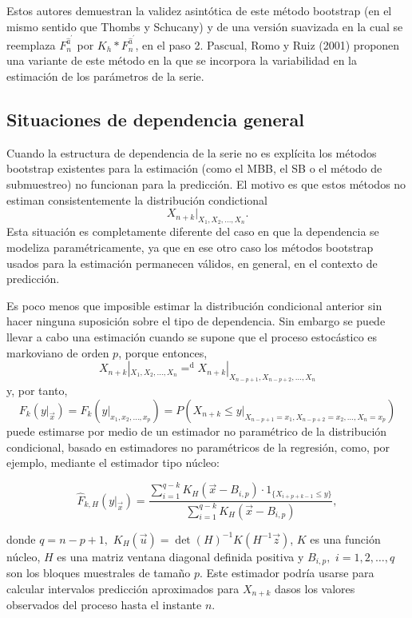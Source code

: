 \documentclass[
]{book}
\theoremstyle{definition}
\theoremstyle{definition}
\theoremstyle{definition}
\theoremstyle{remark}
\begin{document}
Estos autores demuestran la validez asintótica de este método bootstrap
(en el mismo sentido que Thombs y Schucany) y de una versión suavizada
en la cual se reemplaza \(F_n^{\widehat{a}^{\prime}}\) por
\(K_{h}\ast F_n^{\widehat{a}^{\prime}}\), en el paso 2. Pascual, Romo y
Ruiz (2001) proponen una variante de este método en la que se incorpora
la variabilidad en la estimación de los parámetros de la serie.

\hypertarget{situaciones-de-dependencia-general-2}{%
\subsection{Situaciones de dependencia general}\label{situaciones-de-dependencia-general-2}}

Cuando la estructura de dependencia de la serie no es explícita los
métodos bootstrap existentes para la estimación (como el MBB, el SB o el
método de submuestreo) no funcionan para la predicción. El motivo es que
estos métodos no estiman consistentemente la distribución condictional
\[X_{n+k}|_{X_1,X_2,\ldots ,X_n}.\]
Esta situación es
completamente diferente del caso en que la dependencia se modeliza
paramétricamente, ya que en ese otro caso los métodos bootstrap usados
para la estimación permanecen válidos, en general, en el contexto de
predicción.

Es poco menos que imposible estimar la distribución condicional anterior
sin hacer ninguna suposición sobre el tipo de dependencia. Sin embargo
se puede llevar a cabo una estimación cuando se supone que el proceso
estocástico es markoviano de orden \(p\), porque entonces,
\[X_{n+k}|_{X_1,X_2,\ldots ,X_n}{=}^{\mathrm{d}
}X_{n+k}|_{X_{n-p+1},X_{n-p+2},\ldots ,X_n}\]y, por tanto,
\[F_{k}(y|_{\vec{x}})=F_{k}(y|_{x_1,x_2,\ldots ,x_{p}})=P\left(
X_{n+k}\leq y|_{X_{n-p+1}=x_1,X_{n-p+2}=x_2,\ldots ,X_n=x_{p}} \right)\]puede
estimarse por medio de un estimador no paramétrico de la distribución
condicional, basado en estimadores no paramétricos de la regresión,
como, por ejemplo, mediante el estimador tipo núcleo:

\[\widehat{F}_{k,H}(y|_{\vec{x}})=\frac{\sum_{i=1}^{q-k}K_{H}(\vec{x}
-B_{i,p})\cdot 1_{\{X_{i+p+k-1}\leq y\}}}{\sum_{i=1}^{q-k}K_{H}(\vec{x}
-B_{i,p})},\]

donde \(q=n-p+1,\) \(K_{H}(\vec{u})=\det (H)^{-1}K(H^{-1}\vec{z})\), \(K\) es
una función núcleo, \(H\) es una matriz ventana diagonal definida positiva
y \(B_{i,p},\) \(i=1,2,\ldots ,q\) son los bloques muestrales de tamaño \(p\).
Este estimador podría usarse para calcular intervalos predicción
aproximados para \(X_{n+k}\) dasos los valores observados del proceso
hasta el instante \(n\).
\end{document}
